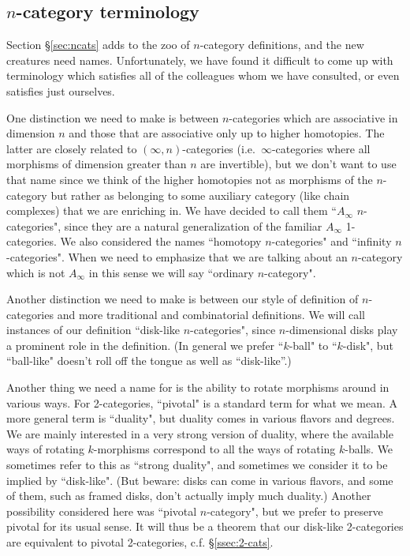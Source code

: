 \subsection{\texorpdfstring{$n$}{n}-category terminology}
\label{n-cat-names}

Section \S \ref{sec:ncats} adds to the zoo of $n$-category definitions, and the new creatures need names.
Unfortunately, we have found it difficult to come up with terminology which satisfies all
of the colleagues whom we have consulted, or even satisfies just ourselves.

One distinction we need to make is between $n$-categories which are associative in dimension $n$ and those
that are associative only up to higher homotopies.
The latter are closely related to $(\infty, n)$-categories (i.e.\ $\infty$-categories where all morphisms
of dimension greater than $n$ are invertible), but we don't want to use that name
since we think of the higher homotopies not as morphisms of the $n$-category but
rather as belonging to some auxiliary category (like chain complexes)
that we are enriching in.
We have decided to call them ``$A_\infty$ $n$-categories", since they are a natural generalization 
of the familiar $A_\infty$ 1-categories.
We also considered the names ``homotopy $n$-categories" and ``infinity $n$-categories".
When we need to emphasize that we are talking about an $n$-category which is not $A_\infty$ in this sense
we will say ``ordinary $n$-category".

Another distinction we need to make is between our style of definition of $n$-categories and
more traditional and combinatorial definitions.
We will call instances of our definition ``disk-like $n$-categories", since $n$-dimensional disks
play a prominent role in the definition.
(In general we prefer ``$k$-ball" to ``$k$-disk", but ``ball-like" doesn't roll off 
the tongue as well as ``disk-like''.)

Another thing we need a name for is the ability to rotate morphisms around in various ways.
For 2-categories, ``pivotal" is a standard term for what we mean.
A more general term is ``duality", but duality comes in various flavors and degrees.
We are mainly interested in a very strong version of duality, where the available ways of
rotating $k$-morphisms correspond to all the ways of rotating $k$-balls.
We sometimes refer to this as ``strong duality", and sometimes we consider it to be implied
by ``disk-like".
(But beware: disks can come in various flavors, and some of them, such as framed disks,
don't actually imply much duality.)
Another possibility considered here was ``pivotal $n$-category", but we prefer to preserve pivotal for its usual sense. 
It will thus be a theorem that our disk-like 2-categories 
are equivalent to pivotal 2-categories, c.f. \S \ref{ssec:2-cats}.

